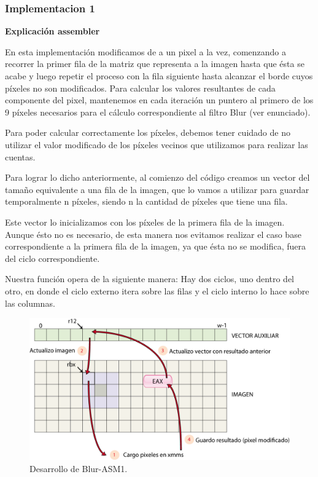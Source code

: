 \subsubsection{Implementacion 1}

\textbf{Explicación assembler}

En esta implementación modificamos de a un pixel a la vez, comenzando a recorrer la primer fila de la matriz que representa a la imagen hasta que ésta se acabe y luego repetir el proceso con la fila siguiente hasta alcanzar el borde cuyos píxeles no son modificados. Para calcular los valores resultantes de cada componente del pixel, mantenemos en cada iteración un puntero al primero de los 9 píxeles necesarios para el cálculo correspondiente al filtro Blur (ver enunciado).

Para poder calcular correctamente los píxeles, debemos tener cuidado de no utilizar el valor modificado de los píxeles vecinos que utilizamos para realizar las cuentas.

Para lograr lo dicho anteriormente, al comienzo del código creamos un vector del tamaño equivalente a una fila de la imagen, que lo vamos a utilizar para guardar temporalmente n píxeles, siendo n la cantidad de píxeles que tiene una fila.

Este vector lo inicializamos con los píxeles de la primera fila de la imagen. Aunque ésto no es necesario, de esta manera nos evitamos realizar el caso base correspondiente a la primera fila de la imagen, ya que ésta no se modifica, fuera del ciclo correspondiente.

Nuestra función opera de la siguiente manera:
Hay dos ciclos, uno dentro del otro, en donde el ciclo externo itera sobre las filas y el ciclo interno lo hace sobre las columnas.

\begin{figure}[ht!]
\centering
\includegraphics[width=120mm]{imagenes/blur/blur1-figura1.png}
\caption{Desarrollo de Blur-ASM1.}
\end{figure}

